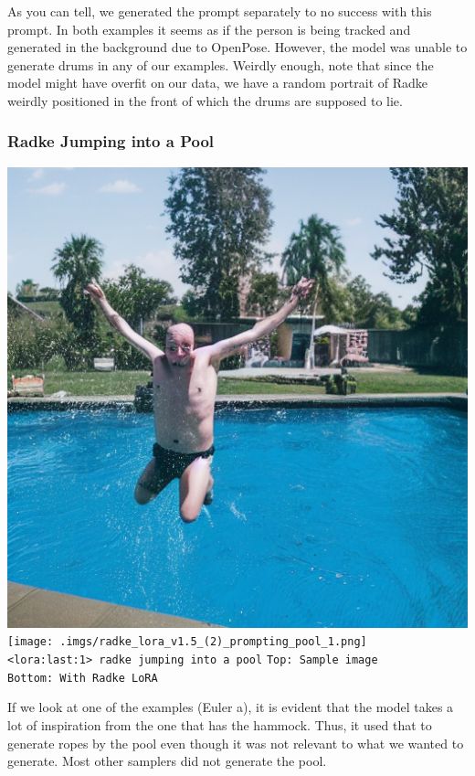 \documentclass{article}
\begin{document}
As you can tell, we generated the prompt separately to no success with this prompt. In both examples it seems as if the person is being tracked and generated in the background due to OpenPose. However, the model was unable to generate drums in any of our examples. Weirdly enough, note that since the model might have overfit on our data, we have a random portrait of Radke weirdly positioned in the front of which the drums are supposed to lie.

\subsubsection{Radke Jumping into a Pool}
\begin{center}
    \includegraphics[scale=0.2]{.imgs/pool_base.png} \\
    \texttt{[image: .imgs/radke\_lora\_v1.5\_(2)\_prompting\_pool\_1.png]} \\
    \verb|<lora:last:1> radke jumping into a pool|
    \verb|Top: Sample image              Bottom: With Radke LoRA|
\end{center}

If we look at one of the examples (Euler a), it is evident that the model takes a lot of inspiration from the one that has the hammock. Thus, it used that to generate ropes by the pool even though it was not relevant to what we wanted to generate. Most other samplers did not generate the pool.
\end{document}
